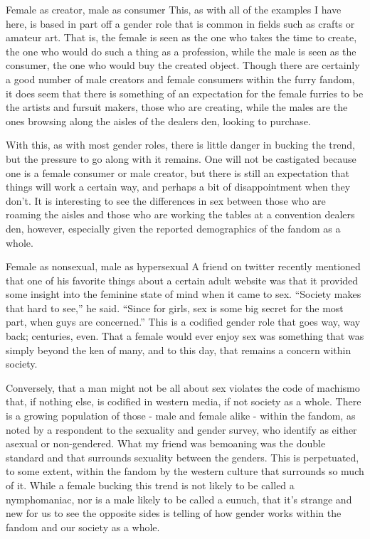 Female as creator, male as consumer This, as with all of the examples I have here, is based in part off a gender role that is common in fields such as crafts or amateur art. That is, the female is seen as the one who takes the time to create, the one who would do such a thing as a profession, while the male is seen as the consumer, the one who would buy the created object. Though there are certainly a good number of male creators and female consumers within the furry fandom, it does seem that there is something of an expectation for the female furries to be the artists and fursuit makers, those who are creating, while the males are the ones browsing along the aisles of the dealers den, looking to purchase.

With this, as with most gender roles, there is little danger in bucking the trend, but the pressure to go along with it remains. One will not be castigated because one is a female consumer or male creator, but there is still an expectation that things will work a certain way, and perhaps a bit of disappointment when they don't. It is interesting to see the differences in sex between those who are roaming the aisles and those who are working the tables at a convention dealers den, however, especially given the reported demographics of the fandom as a whole.

Female as nonsexual, male as hypersexual A friend on twitter recently mentioned that one of his favorite things about a certain adult website was that it provided some insight into the feminine state of mind when it came to sex. ``Society makes that hard to see,'' he said. ``Since for girls, sex is some big secret for the most part, when guys are concerned.'' This is a codified gender role that goes way, way back; centuries, even. That a female would ever enjoy sex was something that was simply beyond the ken of many, and to this day, that remains a concern within society.

Conversely, that a man might not be all about sex violates the code of machismo that, if nothing else, is codified in western media, if not society as a whole. There is a growing population of those - male and female alike - within the fandom, as noted by a respondent to the sexuality and gender survey, who identify as either asexual or non-gendered. What my friend was bemoaning was the double standard and that surrounds sexuality between the genders. This is perpetuated, to some extent, within the fandom by the western culture that surrounds so much of it. While a female bucking this trend is not likely to be called a nymphomaniac, nor is a male likely to be called a eunuch, that it's strange and new for us to see the opposite sides is telling of how gender works within the fandom and our society as a whole.


